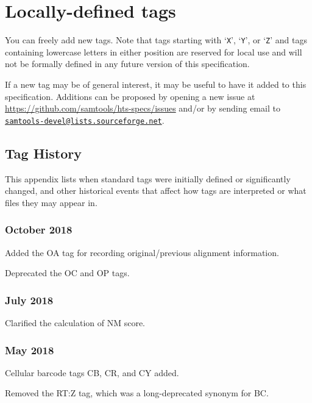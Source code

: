 \documentclass[10pt]{article}
\newcommand{\mailtourl}[1]{\href{mailto:#1}{\tt #1}}
\begin{document}
\section{Locally-defined tags}

You can freely add new tags.
Note that tags starting with `{\tt X}', `{\tt Y}', or `{\tt Z}' and tags
containing lowercase letters in either position are reserved for local use
and will not be formally defined in any future version of this specification.

If a new tag may be of general interest, it may be useful to have it added
to this specification.  Additions can be proposed by opening a new issue at
\url{https://github.com/samtools/hts-specs/issues} and/or by sending email
to \mailtourl{samtools-devel@lists.sourceforge.net}.

\begin{appendices}
\appendix
\section{Tag History}

This appendix lists when standard tags were initially defined or significantly changed, and other historical events that affect how tags are interpreted or what files they may appear in.

\setlength{\parindent}{0pt}
\newcommand*{\gap}{\vspace*{2ex}}

\subsubsection*{October 2018}
Added the OA tag for recording original/previous alignment information. 

Deprecated the OC and OP tags.

\subsubsection*{July 2018}

Clarified the calculation of NM score.

\subsubsection*{May 2018}

Cellular barcode tags CB, CR, and CY added.

Removed the RT:Z tag, which was a long-deprecated synonym for BC.


\end{appendices}
\end{document}
